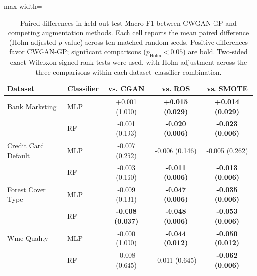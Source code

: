 \begin{table}[htbp]
\centering
\caption{Paired differences in held-out test Macro-F1 between CWGAN-GP and competing augmentation methods. Each cell reports the mean paired difference (Holm-adjusted $p$-value) across ten matched random seeds. Positive differences favor CWGAN-GP; significant comparisons ($p_{\mathrm{Holm}}<0.05$) are bold. Two-sided exact Wilcoxon signed-rank tests were used, with Holm adjustment across the three comparisons within each dataset--classifier combination.}
\label{tab:paired_comparisons}
\small
\begin{adjustbox}{max width=\textwidth}
\begin{tabular}{llccc}
\toprule
Dataset & Classifier & vs. CGAN & vs. ROS & vs. SMOTE \\
\midrule
Bank Marketing & MLP & +0.001 (1.000) & \textbf{+0.015 (0.029)} & \textbf{+0.014 (0.029)} \\
 & RF & -0.001 (0.193) & \textbf{-0.020 (0.006)} & \textbf{-0.023 (0.006)} \\
\midrule
Credit Card Default & MLP & -0.007 (0.262) & -0.006 (0.146) & -0.005 (0.262) \\
 & RF & -0.003 (0.160) & \textbf{-0.011 (0.006)} & \textbf{-0.013 (0.006)} \\
\midrule
Forest Cover Type & MLP & -0.009 (0.131) & \textbf{-0.047 (0.006)} & \textbf{-0.035 (0.006)} \\
 & RF & \textbf{-0.008 (0.037)} & \textbf{-0.048 (0.006)} & \textbf{-0.053 (0.006)} \\
\midrule
Wine Quality & MLP & -0.000 (1.000) & \textbf{-0.044 (0.012)} & \textbf{-0.050 (0.012)} \\
 & RF & -0.008 (0.645) & -0.011 (0.645) & \textbf{-0.062 (0.006)} \\
\bottomrule
\end{tabular}
\end{adjustbox}
\end{table}
